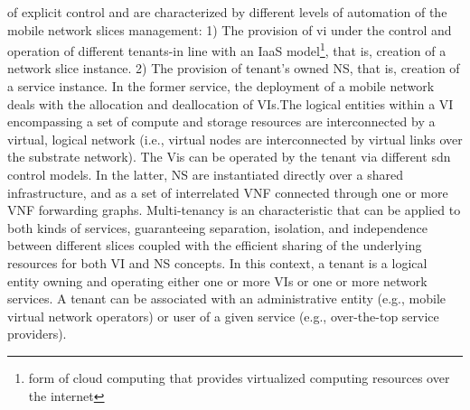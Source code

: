 \documentclass{article}
\begin{document}
of explicit control and are characterized by different levels of automation of the
mobile network slices management:
1) The provision of \gls{vi} under the control and operation
of different tenants-in line with an \gls{IaaS} model\footnote{form of cloud computing that provides virtualized computing resources over the internet},
that is, creation of a network slice instance.
2) The provision of tenant's owned \gls{NS}, that is, creation of a service instance.
In the former service, the deployment of a mobile network deals with the
allocation and deallocation of VIs.The logical entities within a VI encompassing
a set of compute and storage resources are interconnected by a virtual, logical
network (i.e., virtual nodes are interconnected by virtual links over the substrate
network). The Vis can be operated by the tenant via different \gls{sdn} control
models. In the latter, NS are instantiated directly over a shared infrastructure,
and as a set of interrelated \gls{VNF} connected through
one or more VNF forwarding graphs.
Multi-tenancy is an characteristic that can be applied to both
kinds of services, guaranteeing separation, isolation, and independence between
different slices coupled with the efficient sharing of the underlying resources
for both VI and NS concepts. In this context, a tenant is a logical entity owning and operating either one or more VIs or one or more network services. A tenant can be associated with an administrative entity (e.g., mobile virtual network operators) or
user of a given service (e.g., over-the-top service providers).


\newpage
\end{document}

